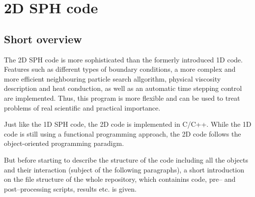 \documentclass{report}
\begin{document}
\section{2D SPH code}
\label{sec:2DSPHcode}
\subsection{Short overview}
\label{sec:shortOverview2D}
The 2D SPH code is more sophisticated than the formerly introduced 1D code. Features such as different types of boundary conditions, a more complex and more efficient neighbouring particle search allgorithm, physical viscosity description and heat conduction, as well as an automatic time stepping control are implemented. Thus, this program is more flexible and can be used to treat problems of real scientific and practical importance. 

Just like the 1D SPH code, the 2D code is implemented in C/C++. While the 1D code is still using a functional programming approach, the 2D code follows the object-oriented programming paradigm.

But before starting to describe the structure of the code including all the objects and their interaction (subject of the following paragraphs), a short introduction on the file structure of the whole repository, which containins code, pre-- and post--processing scripts, results etc. is given.
\end{document}

